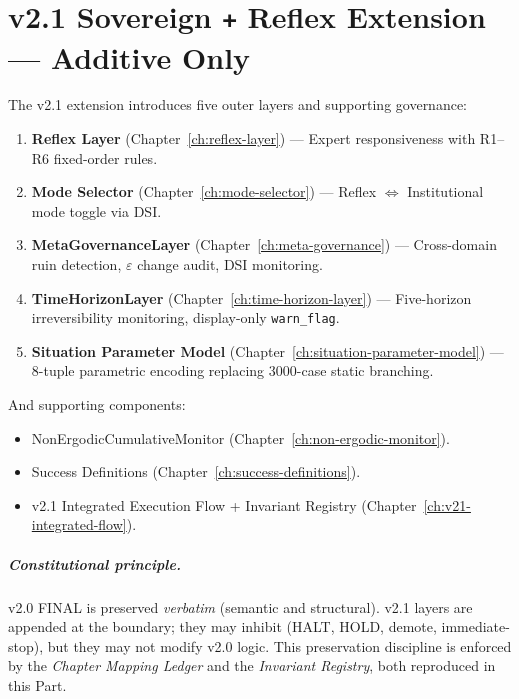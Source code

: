 
\chapter{v2.1 Sovereign \texttt{+} Reflex Extension ---
Additive Only}
\label{ch:v21-extension-preamble}


The v2.1 extension introduces five outer layers and supporting
governance:

\begin{enumerate}
\item \textbf{Reflex Layer} (Chapter~\ref{ch:reflex-layer}) ---
Expert responsiveness with R1--R6 fixed-order rules.
\item \textbf{Mode Selector} (Chapter~\ref{ch:mode-selector}) ---
Reflex $\Leftrightarrow$ Institutional mode toggle via DSI.
\item \textbf{MetaGovernanceLayer}
(Chapter~\ref{ch:meta-governance}) --- Cross-domain ruin detection,
$\varepsilon$ change audit, DSI monitoring.
\item \textbf{TimeHorizonLayer}
(Chapter~\ref{ch:time-horizon-layer}) --- Five-horizon irreversibility
monitoring, display-only \texttt{warn\_flag}.
\item \textbf{Situation Parameter Model}
(Chapter~\ref{ch:situation-parameter-model}) --- 8-tuple parametric
encoding replacing 3000-case static branching.
\end{enumerate}

\noindent
And supporting components:

\begin{itemize}
\item NonErgodicCumulativeMonitor
(Chapter~\ref{ch:non-ergodic-monitor}).
\item Success Definitions (Chapter~\ref{ch:success-definitions}).
\item v2.1 Integrated Execution Flow + Invariant Registry
(Chapter~\ref{ch:v21-integrated-flow}).
\end{itemize}

\paragraph{Constitutional principle.}
v2.0 FINAL is preserved \emph{verbatim} (semantic and structural).
v2.1 layers are appended at the boundary; they may inhibit (HALT,
HOLD, demote, immediate-stop), but they may not modify v2.0 logic.
This preservation discipline is enforced by the
\emph{Chapter Mapping Ledger} and the
\emph{Invariant Registry}, both reproduced in this Part.

